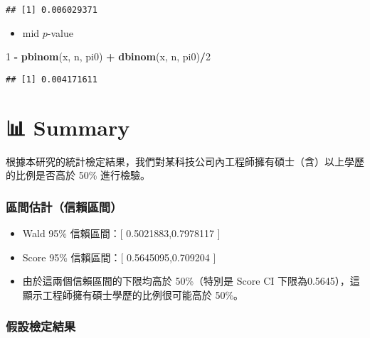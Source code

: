 \documentclass[
]{article}
\newenvironment{Shaded}{\begin{snugshade}}{\end{snugshade}}
\newcommand{\DecValTok}[1]{\textcolor[rgb]{0.00,0.00,0.81}{#1}}
\newcommand{\FunctionTok}[1]{\textcolor[rgb]{0.13,0.29,0.53}{\textbf{#1}}}
\newcommand{\NormalTok}[1]{#1}
\newcommand{\SpecialCharTok}[1]{\textcolor[rgb]{0.81,0.36,0.00}{\textbf{#1}}}
\providecommand{\tightlist}{%
  \setlength{\itemsep}{0pt}\setlength{\parskip}{0pt}}
\begin{document}
\begin{verbatim}
## [1] 0.006029371
\end{verbatim}

\begin{itemize}
\tightlist
\item
  mid \(p\)-value
\end{itemize}

\begin{Shaded}
\begin{Highlighting}[]
\DecValTok{1} \SpecialCharTok{{-}} \FunctionTok{pbinom}\NormalTok{(x, n, pi0) }\SpecialCharTok{+} \FunctionTok{dbinom}\NormalTok{(x, n, pi0)}\SpecialCharTok{/}\DecValTok{2}
\end{Highlighting}
\end{Shaded}

\begin{verbatim}
## [1] 0.004171611
\end{verbatim}

\hypertarget{summary}{%
\section{📊 Summary}\label{summary}}

根據本研究的統計檢定結果，我們對某科技公司內工程師擁有碩士（含）以上學歷的比例是否高於
50\% 進行檢驗。

\hypertarget{ux5340ux9593ux4f30ux8a08ux4fe1ux8cf4ux5340ux9593}{%
\subsubsection{區間估計（信賴區間）}\label{ux5340ux9593ux4f30ux8a08ux4fe1ux8cf4ux5340ux9593}}

\begin{itemize}
\tightlist
\item
  Wald 95\% 信賴區間：{[} 0.5021883,0.7978117 {]}
\item
  Score 95\% 信賴區間：{[} 0.5645095,0.709204 {]}
\item
  由於這兩個信賴區間的下限均高於 50\%（特別是 Score CI
  下限為0.5645），這顯示工程師擁有碩士學歷的比例很可能高於 50\%。
\end{itemize}

\hypertarget{ux5047ux8a2dux6aa2ux5b9aux7d50ux679c}{%
\subsubsection{假設檢定結果}\label{ux5047ux8a2dux6aa2ux5b9aux7d50ux679c}}
\end{document}
